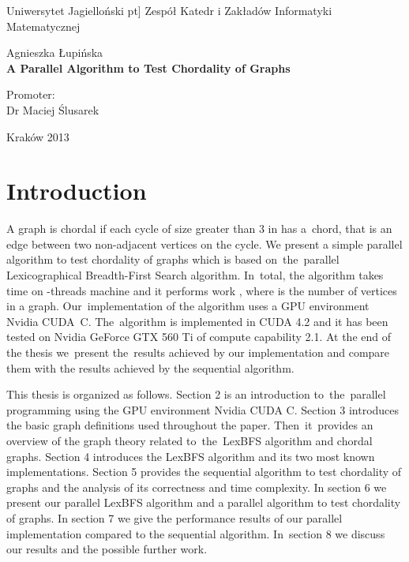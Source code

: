 \documentclass[a4paper, 11pt]{article}
\begin{document}
\begin{titlepage}
\begin{center}
{\LARGE Uniwersytet Jagielloński} \3pt]
{\Large Zespół Katedr i Zakładów Informatyki Matematycznej}
\vspace{2.5cm}

{\Large Agnieszka Łupińska}\\

\vspace{3cm}
{\huge \bf A Parallel Algorithm to Test Chordality of Graphs}\\
\vspace{4cm}

\end{center}
\begin{flushright}
Promoter:\\
{Dr Maciej Ślusarek}\\
\end{flushright}
\vspace{1.5cm}
\begin{center}
{\Large Kraków 2013}
\end{center}
\end{titlepage}
\newpage
\tableofcontents
\newpage

\section{Introduction}

A graph  is chordal if each cycle of size greater than 3 in  has a~chord, 
that is an edge between two non-adjacent vertices on the cycle. 
We present a simple parallel algorithm to test chordality of graphs 
which is based on~the~parallel Lexicographical Breadth-First Search 
algorithm. In~total, the algorithm takes time  on -threads machine and it 
performs work , where  is the number of vertices in a graph. Our~implementation 
of the algorithm uses a GPU environment Nvidia CUDA~C. 
The~algorithm is implemented in CUDA 4.2 and it has been tested on Nvidia 
GeForce GTX 560 Ti of compute capability 2.1. At the end of the thesis 
we~present the~results achieved by our implementation and compare them 
with the results achieved by the sequential algorithm.

This thesis is organized as follows. Section 2 is an introduction to~the~parallel programming
using the GPU environment Nvidia CUDA C. Section 3 introduces the basic graph definitions used
throughout the paper. Then~it~provides an overview of the graph theory related to~the~LexBFS 
algorithm and chordal graphs. Section 4 introduces the LexBFS algorithm and its two most 
known implementations. Section 5 provides the sequential algorithm to test chordality of graphs 
and the analysis of its correctness and time complexity. In section 6 we 
present our parallel LexBFS algorithm and a parallel algorithm to test chordality of graphs. 
In section 7 we give the performance results of our parallel implementation compared to
the sequential algorithm. In~section 8 we discuss our results and the possible further work.
\newpage
\end{document}

